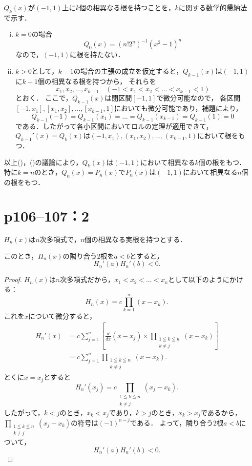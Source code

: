 \begin{tproof}
  $Q_k (x)$が$(-1,1)$上に$k$個の相異なる根を持つことを，$k$に関する数学的帰納法で示す．
  \begin{enumerate}[(i)]
    \item $k=0$の場合
          \[
            Q_0(x)= (n! 2^n)^{-1} (x^2-1)^n
          \]
          なので，$(-1,1)$に根を持たない．
    \item $k>0$として，$k-1$の場合の主張の成立を仮定すると，$Q_{k-1}(x)$は$(-1,1)$に$k-1$個の相異なる根を持つから，
          それらを
          \[
            x_1,x_2,\dots,x_{k-1}\quad (-1<x_1<x_2<\dots <x_{k-1}<1)
          \]とおく．
          ここで，$Q_{k-1} (x)$は閉区間$[-1,1]$で微分可能なので，
          各区間$[-1,x_1],[x_1,x_2],\dots,[x_{k-1},1]$においても微分可能であり，補題により，
          \[
            Q_{k-1} (-1) = Q_{k-1}(x_1)=\dots = Q_{k-1}(x_{k-1})=Q_{k-1}(1)=0
          \]
          である．したがって各小区間においてロルの定理が適用できて，$Q_{k-1}' (x)=Q_k(x)$は$(-1,x_1),(x_1,x_2),\dots,(x_{k-1},1)$において根をもつ．
  \end{enumerate}
  以上()，()の議論により，$Q_k (x)$は$(-1,1)$において相異なる$k$個の根をもつ．
  特に$k=n$のとき，$Q_n (x)=P_n(x)$で$P_n (x)$は$(-1,1)$において相異なる$n$個の根をもつ．
\end{tproof}



\section*{p106--107：2}


\begin{lemma}{}{}
  $H_n(x)$は$n$次多項式で，$n$個の相異なる実根を持つとする．

  このとき，$H_n (x)$の隣り合う$2$根を$a < b$とすると，
  \[
    H_n'(a) H_n'(b)<0.
  \]
\end{lemma}

\begin{proof}
  $H_n (x)$は$n$次多項式だから，$x_1 < x_2 < \dots <x_n$として以下のようにかける：
  \[
    H_n (x) = c \prod_{k=1}^{n} (x-x_k).
  \]
  これを$x$について微分すると，
  \begin{align*}
    H_n '(x) & = c \sum_{j=1}^{n} \left[ \frac{d}{dx} (x-x_j) \times  \prod_{\substack{1 \leqq k \leqq n \\ k \ne j}} (x-x_k) \right] \\
             & = c \sum_{j=1}^{n} \prod_{\substack{1 \leqq k \leqq n                                     \\ k \ne j}} (x-x_k).
  \end{align*}
  とくに$x = x_j$とすると
  \[
    H_n '(x_j) = c \prod_{\substack{1 \leqq k \leqq n \\ k \ne j}} (x_j-x_k).
  \]
  したがって，$k <j$のとき，$x_k < x_j$であり，$k > j$のとき，$x_k > x_j$であるから，
  $\prod_{\substack{1 \leqq k \leqq n \\ k \ne j}} (x_j-x_k)$の符号は$(-1)^{n-j}$である．
  よって，隣り合う$2$根$a < b$について，
  \[
    H_n '(a) H_n ' (b)<0.
  \]
\end{proof}

